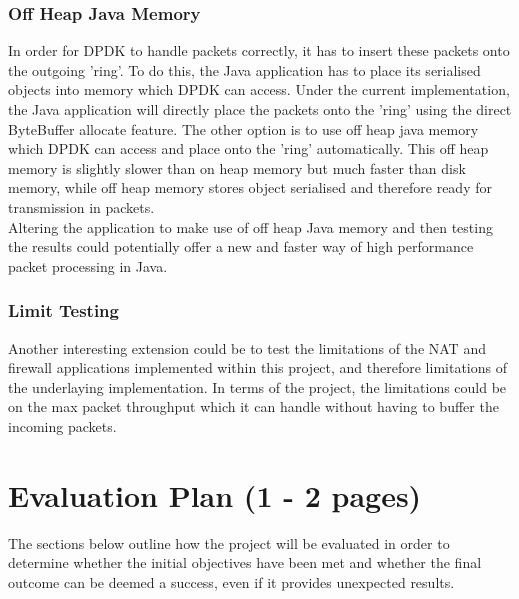 \documentclass[a4paper, titlepage]{article}
\begin{document}
\subsubsection{Off Heap Java Memory}
In order for DPDK to handle packets correctly, it has to insert these packets onto the outgoing 'ring'. To do this, the Java application has to place its serialised objects into memory which DPDK can access. Under the current implementation, the Java application will directly place the packets onto the 'ring' using the direct ByteBuffer allocate feature. The other option is to use off heap java memory which DPDK can access and place onto the 'ring' automatically. This off heap memory is slightly slower than on heap memory but much faster than disk memory, while off heap memory stores object serialised and therefore ready for transmission in packets. \\
\newline
Altering the application to make use of off heap Java memory and then testing the results could potentially offer a new and faster way of high performance packet processing in Java.

\subsubsection{Limit Testing}
Another interesting extension could be to test the limitations of the NAT and firewall applications implemented within this project, and therefore limitations of the underlaying implementation. In terms of the project, the limitations could be on the max packet throughput which it can handle without having to buffer the incoming packets.

\newpage

\section{Evaluation Plan (1 - 2 pages)}
The sections below outline how the project will be evaluated in order to determine whether the initial objectives have been met and whether the final outcome can be deemed a success, even if it provides unexpected results.
\end{document}
